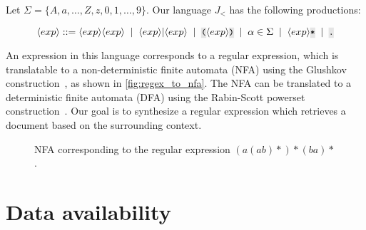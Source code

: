 \documentclass{article}
\newcommand{\inline}[1]{%
    \begingroup%
    \sethlcolor{slightgray}%
    \hl{\ttfamily\footnotesize #1}%
    \endgroup
}
\newcommand{\inline}[1]{%
    \begingroup%
    \sethlcolor{slightgray}%
    \hl{\ttfamily\footnotesize #1}%
    \endgroup
}
\begin{document}
\newcommand{\mor}{\ensuremath{\;\mid\;}}
\newcommand{\code}[1]{\ensuremath{\texttt{\inline{#1}}}}
\newcommand{\bnfrl}[1]{\ensuremath{\langle#1\rangle}}
\allowdisplaybreaks

Let $\Sigma = \{A, a, \ldots, Z, z, 0, 1, \ldots, 9\}$. Our language $J_{<}$ has the following productions:

\begin{equation}
    \bnfrl{exp} ::= \bnfrl{exp}\bnfrl{exp} \mor \bnfrl{exp}|\bnfrl{exp} \mor \code{(}\bnfrl{exp}\code{)} \mor \alpha \in \Sigma \mor \bnfrl{exp}\code{*} \mor
    \code{.}
\end{equation}

An expression in this language corresponds to a regular expression, which is translatable to a non-deterministic finite automata (NFA) using the Glushkov construction~\citep{glushkov1961abstract}, as shown in \autoref{fig:regex_to_nfa}. The NFA can be translated to a deterministic finite automata (DFA) using the Rabin-Scott powerset construction~\citep{rabin1959finite}. Our goal is to synthesize a regular expression which retrieves a document based on the surrounding context.

\begin{figure}
    \caption{NFA corresponding to the regular expression $(a(ab)*)*(ba)*$.}
    \label{fig:regex_to_nfa}
\end{figure}

\section{Data availability}
\end{document}
